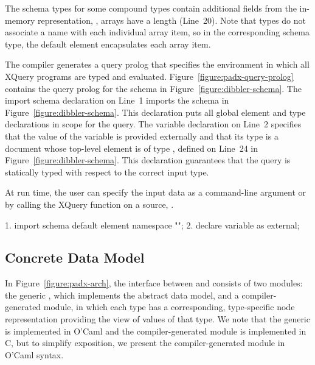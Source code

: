 The schema types for some compound types contain additional fields
from the \pads{} in-memory representation, \eg{}, arrays have a length
(Line~20).  Note that  types do not associate a name with
each individual array item, so in the corresponding schema type, the
default element  encapsulates each array item.

The \pads{} compiler generates a query prolog that specifies the
environment in which all XQuery programs are typed and evaluated. 
Figure~\ref{figure:padx-query-prolog} contains the query prolog for
the schema in Figure~\ref{figure:dibbler-schema}.  The import schema
declaration on Line~1 imports the schema in
Figure~\ref{figure:dibbler-schema}.  This declaration puts all global
element and type declarations in scope for the query.  The variable
declaration on Line~2 specifies that the value of the variable
 is provided externally and that its type is a document
whose top-level element is of type , defined on Line~24 in
Figure~\ref{figure:dibbler-schema}.  This declaration guarantees
that the query is statically typed with respect to the correct input type.

At run time, the user can specify
the input data as a command-line argument or by calling the XQuery
 function on a \pads{} source, \eg{} .
\begin{figure*}
\begin{small}
\begin{code}
 1. import schema default element namespace "";
 2. declare variable  as  external; 
\end{code}
\end{small}
\caption{\padx{} generated query prolog}
\label{figure:padx-query-prolog}
\end{figure*}

\subsection{\padx{} Concrete Data Model}

In Figure~\ref{figure:padx-arch}, the interface between \Galax{} and
\pads{} consists of two modules: the generic \padx{} \condm{},
which implements the \Galax{} abstract data model, and a
compiler-generated module, in which each \pads{} type has a
corresponding, type-specific node representation providing the \Xml{}
view of values of that type.  We note that the generic \condm{} is
implemented in O'Caml and the compiler-generated module is implemented
in C, but to simplify exposition, we present the compiler-generated
module in O'Caml syntax. 

